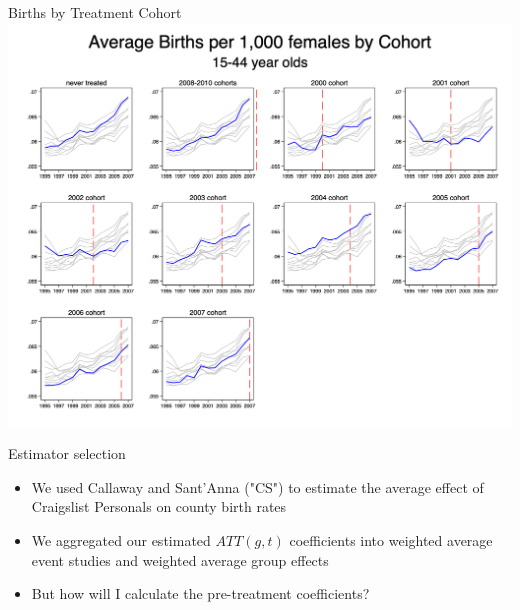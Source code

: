 \documentclass{beamer}
\begin{document}
\begin{frame}{Births by Treatment Cohort}
    \includegraphics[width=\textwidth,height=0.9\textheight,keepaspectratio]{./lecture_includes/pretty_births.png}
\end{frame}


\begin{frame}{Estimator selection}

\begin{itemize}

\item We used Callaway and Sant'Anna ("CS") to estimate the average effect of Craigslist Personals on county birth rates 
\item We aggregated our estimated $ATT(g,t)$ coefficients into weighted average event studies and weighted average group effects
\item But how will I calculate the pre-treatment coefficients?

\end{itemize}

\end{frame}
\end{document}
